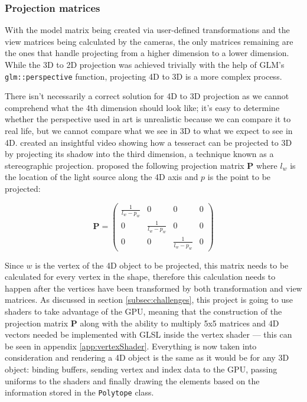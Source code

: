 \documentclass[11pt, a4paper]{article}
\begin{document}
\subsubsection{Projection matrices}

With the model matrix being created via user-defined transformations and the view matrices being calculated by the cameras, the only matrices remaining are the ones that handle projecting from a higher dimension to a lower dimension. While the 3D to 2D projection was achieved trivially with the help of GLM's \texttt{glm::perspective} function, projecting 4D to 3D is a more complex process.

There isn't necessarily a correct solution for 4D to 3D projection as we cannot comprehend what the 4th dimension should look like; it's easy to determine whether the perspective used in art is unrealistic because we can compare it to real life, but we cannot compare what we see in 3D to what we expect to see in 4D. \citeauthor{schloss2016understanding} \parencite*[2:42]{schloss2016understanding} created an insightful video showing how a tesseract can be projected to 3D by projecting its shadow into the third dimension, a technique known as a stereographic projection. \citeauthor{schloss2016understanding} proposed the following projection matrix $\textbf{P}$ where $l_w$ is the location of the light source along the 4D axis and $p$ is the point to be projected:

\begin{equation*}
  \textbf{P} =
  \begin{pmatrix}
    \frac{1}{l_w - p_w} & 0 & 0 & 0 \\
    0 & \frac{1}{l_w - p_w} & 0 & 0 \\
    0 & 0 & \frac{1}{l_w - p_w} & 0
  \end{pmatrix}
\end{equation*}

Since $w$ is the vertex of the 4D object to be projected, this matrix needs to be calculated for every vertex in the shape, therefore this calculation needs to happen after the vertices have been transformed by both transformation and view matrices. As discussed in section \ref{subsec:challenges}, this project is going to use shaders to take advantage of the GPU, meaning that the construction of the projection matrix $\textbf{P}$ along with the ability to multiply 5x5 matrices and 4D vectors needed be implemented with GLSL inside the vertex shader --- this can be seen in appendix \ref{app:vertexShader}. Everything is now taken into consideration and rendering a 4D object is the same as it would be for any 3D object: binding buffers, sending vertex and index data to the GPU, passing uniforms to the shaders and finally drawing the elements based on the information stored in the \texttt{Polytope} class.
\end{document}
